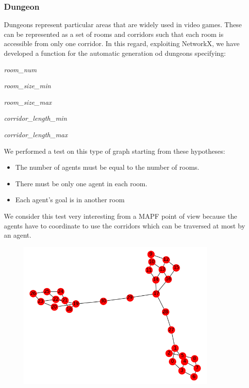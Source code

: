 \documentclass[12pt, a4paper, hidelinks]{article}
\numberwithin{equation}{section}
\begin{document}
\subsubsection{Dungeon}
Dungeons represent particular areas that are widely used in video games. These can be represented as a set of rooms and corridors such that each room is accessible from only one corridor. In this regard, exploiting NetworkX, we have developed a function for the automatic generation od dungeons specifying:
\begin{description}
    \item \textit{room\_num}
    \item \textit{room\_size\_min}
    \item \textit{room\_size\_max}
    \item \textit{corridor\_length\_min}
    \item \textit{corridor\_length\_max}
\end{description}
We performed a test on this type of graph starting from these hypotheses:
\begin{itemize} 
\item The number of agents must be equal to the number of rooms.
\item There must be only one agent in each room.
\item Each agent's goal is in another room
\end{itemize}
We consider this test very interesting from a MAPF point of view because the agents have to coordinate to use the corridors which can be traversed at most by an agent.
\begin{figure}[h!]
\begin{center}
  \includegraphics[width=10cm]{dungeon.png}\\
\end{center}
\end{figure}
\end{document}
